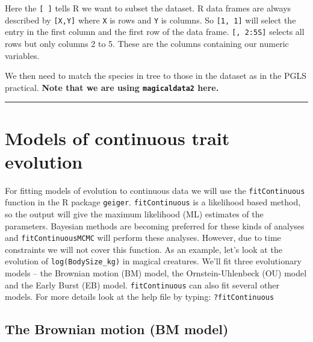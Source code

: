 \documentclass[]{book}
\newenvironment{Shaded}{\begin{snugshade}}{\end{snugshade}}
\newcommand{\KeywordTok}[1]{\textcolor[rgb]{0.13,0.29,0.53}{\textbf{{#1}}}}
\newcommand{\StringTok}[1]{\textcolor[rgb]{0.31,0.60,0.02}{{#1}}}
\newcommand{\NormalTok}[1]{{#1}}
\begin{document}
Here the \texttt{{[}\ {]}} tells R we want to subset the dataset. R data
frames are always described by \texttt{{[}X,Y{]}} where \texttt{X} is
rows and \texttt{Y} is columns. So \texttt{{[}1,\ 1{]}} will select the
entry in the first column and the first row of the data frame.
\texttt{{[},\ 2:5S{]}} selects all rows but only columns 2 to 5. These
are the columns containing our numeric variables.

We then need to match the species in tree to those in the dataset as in
the PGLS practical. \textbf{Note that we are using \texttt{magicaldata2}
here.}

\begin{Shaded}
\end{Shaded}

\begin{center}\rule{0.5\linewidth}{\linethickness}\end{center}

\section{Models of continuous trait
evolution}\label{models-of-continuous-trait-evolution}

For fitting models of evolution to continuous data we will use the
\texttt{fitContinuous} function in the R package \texttt{geiger}.
\texttt{fitContinuous} is a likelihood based method, so the output will
give the maximum likelihood (ML) estimates of the parameters. Bayesian
methods are becoming preferred for these kinds of analyses and
\texttt{fitContinuousMCMC} will perform these analyses. However, due to
time constraints we will not cover this function. As an example, let's
look at the evolution of \texttt{log(BodySize\_kg)} in magical
creatures. We'll fit three evolutionary models -- the Brownian motion
(BM) model, the Ornstein-Uhlenbeck (OU) model and the Early Burst (EB)
model. \texttt{fitContinuous} can also fit several other models. For
more details look at the help file by typing: \texttt{?fitContinuous}

\subsection{The Brownian motion (BM
model)}\label{the-brownian-motion-bm-model}
\end{document}
